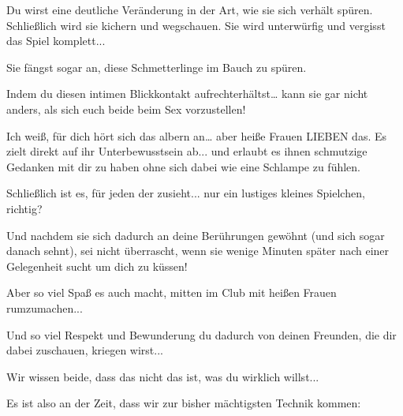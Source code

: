 Du wirst eine deutliche Veränderung in der Art, wie sie sich verhält spüren. Schließlich wird sie kichern und wegschauen. Sie wird unterwürfig und
vergisst das Spiel komplett...

Sie fängst sogar an, diese Schmetterlinge im Bauch zu spüren.

Indem du diesen intimen Blickkontakt aufrechterhältst… kann sie gar nicht anders, als sich euch beide beim Sex vorzustellen!

Ich weiß, für dich hört sich das albern an… aber heiße Frauen LIEBEN das. Es zielt direkt auf ihr Unterbewusstsein ab... und erlaubt es ihnen schmutzige Gedanken mit dir zu haben ohne sich dabei wie eine Schlampe zu fühlen.

Schließlich ist es, für jeden der zusieht... nur ein lustiges kleines Spielchen, richtig?

Und nachdem sie sich dadurch an deine Berührungen gewöhnt (und sich sogar danach sehnt), sei nicht überrascht, wenn sie wenige Minuten später nach einer Gelegenheit sucht um dich zu küssen!

Aber so viel Spaß es auch macht, mitten im Club mit heißen Frauen rumzumachen...

Und so viel Respekt und Bewunderung du dadurch von deinen Freunden, die dir dabei zuschauen, kriegen wirst...

Wir wissen beide, dass das nicht das ist, was du wirklich willst...

Es ist also an der Zeit, dass wir zur bisher mächtigsten Technik kommen: